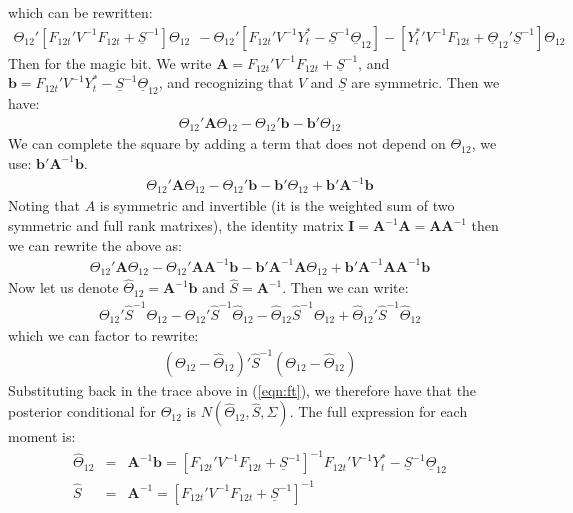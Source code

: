 \documentclass[letter,10pt]{article}
\begin{document}
which can be rewritten:
\begin{eqnarray}
\Theta_{12}' \left[ F_{12t}' V^{-1} F_{12t} + \underline{S}^{-1} \right]\Theta_{12}~~ -  \Theta_{12}' \left[F_{12t}'V^{-1}Y^*_t - \underline{S}^{-1} \underline{\Theta}_{12}\right] - \left[ {Y^*_t}' V^{-1} F_{12t} +\underline{\Theta}_{12}' \underline{S}^{-1} \right] \Theta_{12} 
\end{eqnarray}
Then for the magic bit. We write $\mathbf{A} =   F_{12t}' V^{-1} F_{12t} + \underline{S}^{-1} $, and $\mathbf{b} =  F_{12t}'V^{-1}Y^*_t - \underline{S}^{-1} \underline{\Theta}_{12}$,
and recognizing that $V$ and $\underline{S}$ are symmetric.  Then we have:
\begin{eqnarray}
\Theta_{12}' \mathbf{A} \Theta_{12}  -  \Theta_{12}' \mathbf{b} - \mathbf{b}' \Theta_{12} 
\end{eqnarray}
We can complete the square by adding a term that does not depend on $\Theta_{12}$, we use: $\mathbf{b}' \mathbf{A}^{-1} \mathbf{b}$.  
\begin{eqnarray}
\Theta_{12}' \mathbf{A} \Theta_{12}  -  \Theta_{12}' \mathbf{b} - \mathbf{b}' \Theta_{12}  + \mathbf{b}' \mathbf{A}^{-1} \mathbf{b}
\end{eqnarray}
Noting that $A$ is symmetric
and invertible (it is the weighted sum of two symmetric and full rank matrixes), the identity matrix $\mathbf{I} = \mathbf{A}^{-1} \mathbf{A} = \mathbf{A} \mathbf{A}^{-1}$
then we can rewrite the above as:
\begin{eqnarray}
\Theta_{12}' \mathbf{A} \Theta_{12}  -  \Theta_{12}' \mathbf{A}\mathbf{A}^{-1} \mathbf{b} - \mathbf{b}' \mathbf{A}^{-1}\mathbf{A} \Theta_{12} + \mathbf{b}' \mathbf{A}^{-1}\mathbf{A}\mathbf{A}^{-1} \mathbf{b}
\end{eqnarray}
Now let us denote $\hat{\Theta}_{12} = \mathbf{A}^{-1} \mathbf{b}$ and $\hat{S} = \mathbf{A}^{-1}$.
Then we can write:
\begin{eqnarray}
\Theta_{12}' \hat{S}^{-1} \Theta_{12}  -  \Theta_{12}' \hat{S}^{-1} \hat{\Theta}_{12} - \hat{\Theta}_{12}\hat{S}^{-1} \Theta_{12} + \hat{\Theta}_{12}' \hat{S}^{-1} \hat{\Theta}_{12}
\end{eqnarray}
which we can factor to rewrite:
\begin{eqnarray}
(\Theta_{12} - \hat{\Theta}_{12})' \hat{S}^{-1} (\Theta_{12} - \hat{\Theta}_{12})
\end{eqnarray}
Substituting back in the trace above in (\ref{eqn:ft}), we therefore have that the posterior conditional for $\Theta_{12}$ is $N(\hat{\Theta}_{12},\hat{S},\Sigma)$.  
The full expression for each moment is:
\begin{eqnarray}
\hat{\Theta}_{12} & = &  \mathbf{A}^{-1} \mathbf{b} = \left[  F_{12t}' V^{-1} F_{12t} + \underline{S}^{-1} \right]^{-1} F_{12t}'V^{-1}Y^*_t - \underline{S}^{-1} \underline{\Theta}_{12}\\
\hat{S} & =  & \mathbf{A}^{-1} = \left[ F_{12t}' V^{-1} F_{12t} + \underline{S}^{-1} \right]^{-1}
\end{eqnarray}
\end{document}
